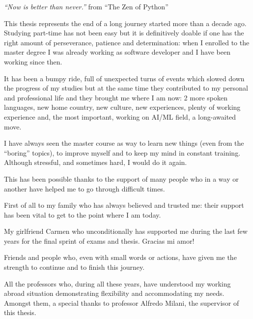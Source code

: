 \thispagestyle{empty}

\begin{flushright}
    {\Huge\textit{``Now is better than never.''}}
    \linebreak
    \linebreak
    from ``The Zen of Python''
\end{flushright}

\clearpage

\thispagestyle{empty}

This thesis represents the end of a long journey started more than a decade
ago. Studying part-time has not been easy but it is definitively doable if one
has the right amount of perseverance, patience and determination: when I
enrolled to the master degree I was already working as software developer and I
have been working since then.

\medskip

It has been a bumpy ride, full of unexpected turns of events which slowed
down the progress of my studies but at the same time they contributed to my
personal and professional life and they brought me where I am now: 2 more
spoken languages, new home country, new culture, new experiences, plenty of
working experience and, the most important, working on AI/ML field, a
long-awaited move.

I have always seen the master course as way to learn new things (even from the
``boring'' topics), to improve myself and to keep my mind in constant training.
Although stressful, and sometimes hard, I would do it again.

\medskip

This has been possible thanks to the support of many people who in a way or
another have helped me to go through difficult times.

First of all to my family who has always believed and trusted me: their support
has been vital to get to the point where I am today.

My girlfriend Carmen who unconditionally has supported me during the last few
years for the final sprint of exams and thesis. Gracias mi amor!

Friends and people who, even with small words or actions, have given me the
strength to continue and to finish this journey.

\medskip

All the professors who, during all these years, have understood my working
abroad situation demonstrating flexibility and accommodating my needs.
Amongst them, a special thanks to professor Alfredo Milani, the supervisor of
this thesis.

